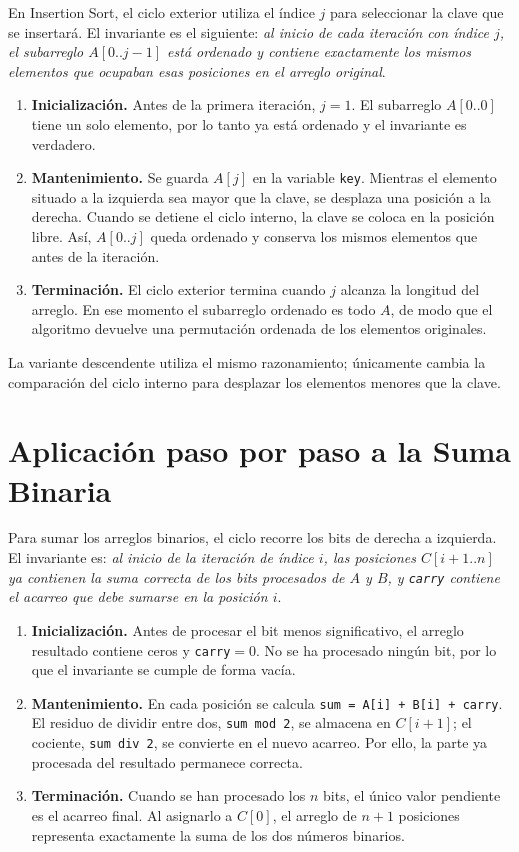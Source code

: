 \documentclass[12pt,letterpaper,oneside]{report}
\begin{document}
En Insertion Sort, el ciclo exterior utiliza el índice $j$ para seleccionar la
clave que se insertará. El invariante es el siguiente: \textit{al inicio de cada
iteración con índice $j$, el subarreglo $A[0..j-1]$ está ordenado y contiene
exactamente los mismos elementos que ocupaban esas posiciones en el arreglo
original}.

\begin{enumerate}
\item \textbf{Inicialización.} Antes de la primera iteración, $j=1$. El
subarreglo $A[0..0]$ tiene un solo elemento, por lo tanto ya está ordenado y el
invariante es verdadero.
\item \textbf{Mantenimiento.} Se guarda $A[j]$ en la variable \texttt{key}.
Mientras el elemento situado a la izquierda sea mayor que la clave, se desplaza
una posición a la derecha. Cuando se detiene el ciclo interno, la clave se coloca
en la posición libre. Así, $A[0..j]$ queda ordenado y conserva los mismos
elementos que antes de la iteración.
\item \textbf{Terminación.} El ciclo exterior termina cuando $j$ alcanza la
longitud del arreglo. En ese momento el subarreglo ordenado es todo $A$, de modo
que el algoritmo devuelve una permutación ordenada de los elementos originales.
\end{enumerate}

La variante descendente utiliza el mismo razonamiento; únicamente cambia la
comparación del ciclo interno para desplazar los elementos menores que la clave.

\section{Aplicación paso por paso a la Suma Binaria}

Para sumar los arreglos binarios, el ciclo recorre los bits de derecha a
izquierda. El invariante es: \textit{al inicio de la iteración de índice $i$,
las posiciones $C[i+1..n]$ ya contienen la suma correcta de los bits procesados
de $A$ y $B$, y \texttt{carry} contiene el acarreo que debe sumarse en la
posición $i$}.

\begin{enumerate}
\item \textbf{Inicialización.} Antes de procesar el bit menos significativo,
el arreglo resultado contiene ceros y \texttt{carry}$=0$. No se ha procesado
ningún bit, por lo que el invariante se cumple de forma vacía.
\item \textbf{Mantenimiento.} En cada posición se calcula
\texttt{sum = A[i] + B[i] + carry}. El residuo de dividir entre dos,
\texttt{sum mod 2}, se almacena en $C[i+1]$; el cociente,
\texttt{sum div 2}, se convierte en el nuevo acarreo. Por ello, la parte ya
procesada del resultado permanece correcta.
\item \textbf{Terminación.} Cuando se han procesado los $n$ bits, el único
valor pendiente es el acarreo final. Al asignarlo a $C[0]$, el arreglo de
$n+1$ posiciones representa exactamente la suma de los dos números binarios.
\end{enumerate}
\end{document}
